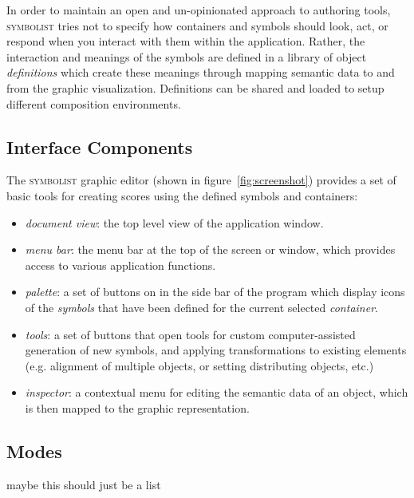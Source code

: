 \documentclass{article}
\def\symbolist{\textsc{symbolist}\xspace}
\begin{document}
In order to maintain an open and un-opinionated approach to authoring tools, \symbolist tries not to specify how containers and symbols should look, act, or respond when you interact with them within the application. Rather, the interaction and meanings of the symbols are defined in a library of object \textit{definitions} which create these meanings through mapping semantic data to and from the graphic visualization. Definitions can be shared and loaded to setup different composition environments.


\subsection{Interface Components}\label{subsec:interface_components}


The \symbolist graphic editor (shown in figure~\ref{fig:screenshot}) provides a set of basic tools for creating scores using the defined symbols and containers:
\begin{itemize}\itemsep0pt %
\item \textit{document view}: the top level view of the application window.
\item \textit{menu bar}: the menu bar at the top of the screen or window, which provides access to various application functions.
\item \textit{palette}: a set of buttons on in the side bar of the program which display icons of the \textit{symbols} that have been defined for the current selected \textit{container}. 
\item \textit{tools}: a set of buttons that open tools for custom computer-assisted generation of new symbols, and applying transformations to existing elements (e.g. alignment of multiple objects, or setting distributing objects, etc.)
\item \textit{inspector}: a contextual menu for editing the semantic data of an object, which is then mapped to the graphic representation.
\end{itemize}

\subsection{Modes}
maybe this should just be a list
\end{document}
